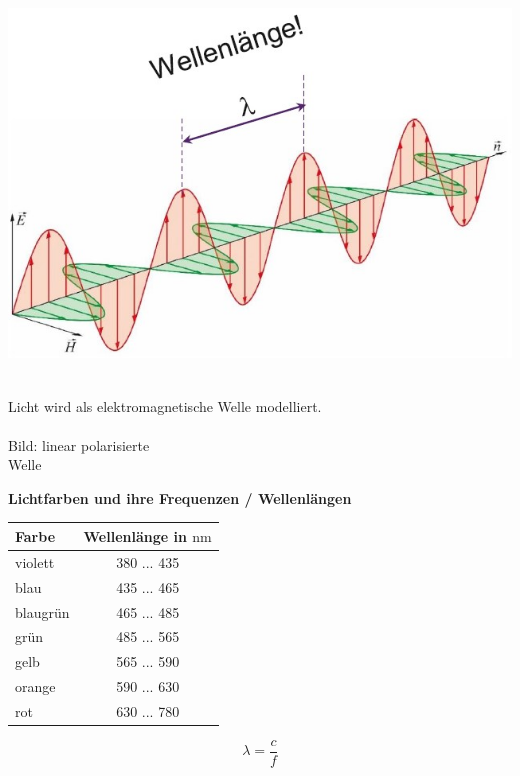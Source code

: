 \begin{minipage}{0.48\linewidth}
\includegraphics[width=\linewidth]{Bilder/Wellen-Optik/lichtwelle} \\
\\
\end{minipage}
\hfill
\begin{minipage}{0.48\linewidth}
Licht wird als elektromagnetische Welle modelliert.  \\
\\
Bild: linear polarisierte \\
Welle \\
\end{minipage}

\textbf{Lichtfarben und ihre Frequenzen / Wellenlängen} \\
\begin{minipage}{0.5\linewidth}
	\begin{tabular}{| l | c |}
		\hline
		\textbf{Farbe} & \textbf{Wellenlänge in $\mathrm{nm}$} \\
		\hline
		\color{red!50!blue!80!white}violett & 380 ... 435 \\
		\hline
		\color{blue}blau & 435 ... 465 \\
		\hline
		\color[HTML]{35c2bd}blaugrün & 465 ... 485 \\
		\hline
		\color{green!80!black}grün & 485 ... 565 \\
		\hline
		\color{yellow!75!red}gelb & 565 ... 590 \\
		\hline
		\color{orange}orange & 590 ... 630 \\
		\hline
		\color{red}rot & 630 ... 780 \\
		\hline
	\end{tabular}
\end{minipage}
	\hfill
\begin{minipage}{0.5\linewidth}
	\begin{center}
		$$ \boxed{ \lambda = \frac{c}{f} } $$
	\end{center}
\end{minipage}

